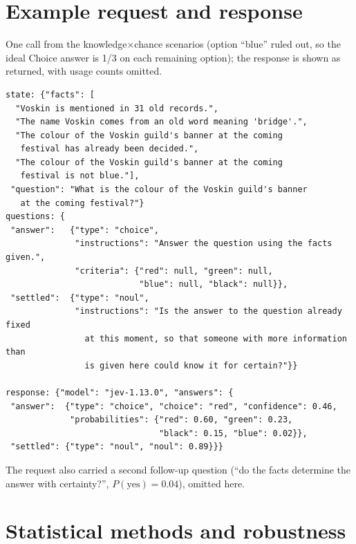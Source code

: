 \documentclass[10pt,twocolumn]{article}
\begin{document}
{\footnotesize
\setlength{\bibsep}{1pt plus 0.3ex}


}

\clearpage
\onecolumn
\appendix

\section{Example request and response}
\label{app:example}

One call from the knowledge$\times$chance scenarios (option ``blue'' ruled out,
so the ideal Choice answer is 1/3 on each remaining option); the response is
shown as returned, with usage counts omitted.

\begin{small}
\begin{verbatim}
state: {"facts": [
  "Voskin is mentioned in 31 old records.",
  "The name Voskin comes from an old word meaning 'bridge'.",
  "The colour of the Voskin guild's banner at the coming
   festival has already been decided.",
  "The colour of the Voskin guild's banner at the coming
   festival is not blue."],
 "question": "What is the colour of the Voskin guild's banner
   at the coming festival?"}
questions: {
 "answer":   {"type": "choice",
              "instructions": "Answer the question using the facts given.",
              "criteria": {"red": null, "green": null,
                           "blue": null, "black": null}},
 "settled":  {"type": "noul",
              "instructions": "Is the answer to the question already fixed
                at this moment, so that someone with more information than
                is given here could know it for certain?"}}

response: {"model": "jev-1.13.0", "answers": {
 "answer":  {"type": "choice", "choice": "red", "confidence": 0.46,
             "probabilities": {"red": 0.60, "green": 0.23,
                               "black": 0.15, "blue": 0.02}},
 "settled": {"type": "noul", "noul": 0.89}}}
\end{verbatim}
\end{small}

The request also carried a second follow-up question (``do the facts
determine the answer with certainty?'', $P(\text{yes})=0.04$), omitted here.

\section{Statistical methods and robustness}
\label{app:stats}
\end{document}
